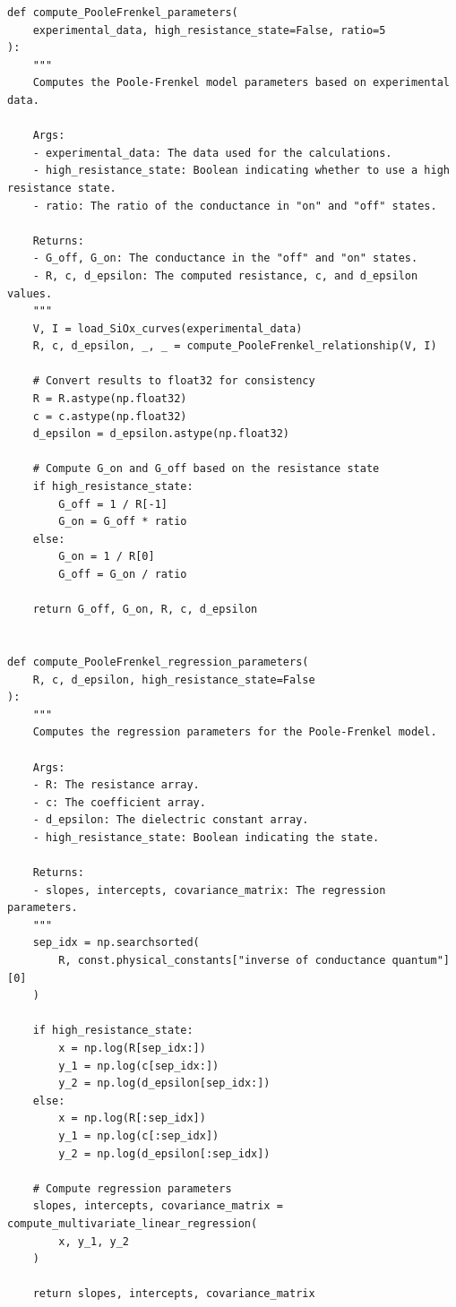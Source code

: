 \begin{lstlisting}[caption={mnn\_torch/effects.py},label={lst:mnn-src-effects}]
def compute_PooleFrenkel_parameters(
    experimental_data, high_resistance_state=False, ratio=5
):
    """
    Computes the Poole-Frenkel model parameters based on experimental data.

    Args:
    - experimental_data: The data used for the calculations.
    - high_resistance_state: Boolean indicating whether to use a high resistance state.
    - ratio: The ratio of the conductance in "on" and "off" states.

    Returns:
    - G_off, G_on: The conductance in the "off" and "on" states.
    - R, c, d_epsilon: The computed resistance, c, and d_epsilon values.
    """
    V, I = load_SiOx_curves(experimental_data)
    R, c, d_epsilon, _, _ = compute_PooleFrenkel_relationship(V, I)

    # Convert results to float32 for consistency
    R = R.astype(np.float32)
    c = c.astype(np.float32)
    d_epsilon = d_epsilon.astype(np.float32)

    # Compute G_on and G_off based on the resistance state
    if high_resistance_state:
        G_off = 1 / R[-1]
        G_on = G_off * ratio
    else:
        G_on = 1 / R[0]
        G_off = G_on / ratio

    return G_off, G_on, R, c, d_epsilon


def compute_PooleFrenkel_regression_parameters(
    R, c, d_epsilon, high_resistance_state=False
):
    """
    Computes the regression parameters for the Poole-Frenkel model.

    Args:
    - R: The resistance array.
    - c: The coefficient array.
    - d_epsilon: The dielectric constant array.
    - high_resistance_state: Boolean indicating the state.

    Returns:
    - slopes, intercepts, covariance_matrix: The regression parameters.
    """
    sep_idx = np.searchsorted(
        R, const.physical_constants["inverse of conductance quantum"][0]
    )

    if high_resistance_state:
        x = np.log(R[sep_idx:])
        y_1 = np.log(c[sep_idx:])
        y_2 = np.log(d_epsilon[sep_idx:])
    else:
        x = np.log(R[:sep_idx])
        y_1 = np.log(c[:sep_idx])
        y_2 = np.log(d_epsilon[:sep_idx])

    # Compute regression parameters
    slopes, intercepts, covariance_matrix = compute_multivariate_linear_regression(
        x, y_1, y_2
    )

    return slopes, intercepts, covariance_matrix
\end{lstlisting}

